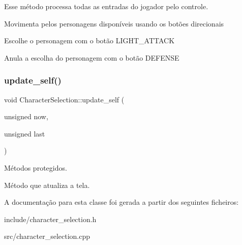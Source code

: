 Esse método processa todas as entradas do jogador pelo controle. 

Movimenta pelos personagens disponíveis usando os botões direcionais

Escolhe o personagem com o botão \textquotesingle{}L\+I\+G\+H\+T\+\_\+\+A\+T\+T\+A\+CK\textquotesingle{}

Anula a escolha do personagem com o botão \textquotesingle{}D\+E\+F\+E\+N\+SE\textquotesingle{} \mbox{\label{classCharacterSelection_ae398845f5f793f40ddf8314a0ad16f7e}} 
\subsubsection{\texorpdfstring{update\+\_\+self()}{update\_self()}}
{\footnotesize\ttfamily void Character\+Selection\+::update\+\_\+self (\begin{DoxyParamCaption}\item[{unsigned}]{now,  }\item[{unsigned}]{last }\end{DoxyParamCaption})\hspace{0.3cm}{\ttfamily [protected]}}



Métodos protegidos. 

Método que atualiza a tela. 

A documentação para esta classe foi gerada a partir dos seguintes ficheiros\+:\begin{DoxyCompactItemize}
\item 
include/character\+\_\+selection.\+h\item 
src/character\+\_\+selection.\+cpp\end{DoxyCompactItemize}
